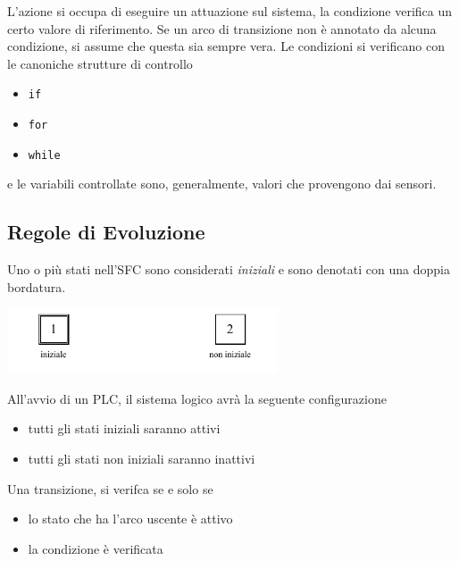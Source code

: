 \documentclass[10pt, letterpaper]{report}
\begin{document}
L'azione si occupa di eseguire un attuazione sul sistema, la condizione verifica un certo valore di riferimento. Se un arco di transizione non è annotato da alcuna condizione, si assume che questa sia sempre vera. Le condizioni si verificano con le canoniche strutture di controllo\begin{itemize}
    \item \texttt{if}
    \item \texttt{for}
    \item \texttt{while}
\end{itemize}
e le variabili controllate sono, generalmente, valori che provengono dai sensori. 
\subsection{Regole di Evoluzione}\label{regolEvo}
Uno o più stati nell'SFC sono considerati \textit{iniziali} e sono denotati con una doppia bordatura.
\begin{center}
    \includegraphics[width=0.6\textwidth ]{images/SFC2.pdf}
\end{center}
All'avvio di un PLC, il sistema logico avrà la seguente configurazione\begin{itemize}
    \item tutti gli stati iniziali saranno attivi 
    \item tutti gli stati non iniziali saranno inattivi 
\end{itemize}
Una transizione, si verifca se e solo se \begin{itemize}
    \item lo stato che ha l'arco uscente è attivo  
    \item la condizione è verificata 
\end{itemize}
\end{document}
